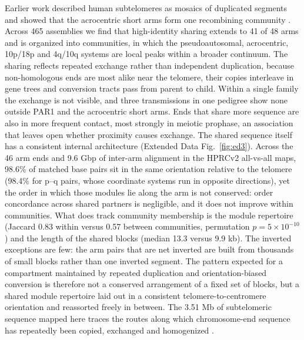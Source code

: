 \documentclass[pdflatex,mathphys]{jnl}
\begin{document}
Earlier work described human subtelomeres as mosaics of duplicated segments \cite{Linardopoulou2005} and showed that the acrocentric short arms form one recombining community \cite{Guarracino2023}. Across 465 assemblies we find that high-identity sharing extends to 41 of 48 arms and is organized into communities, in which the pseudoautosomal, acrocentric, 10p/18p and 4q/10q systems are local peaks within a broader continuum. The sharing reflects repeated exchange rather than independent duplication, because non-homologous ends are most alike near the telomere, their copies interleave in gene trees and conversion tracts pass from parent to child. Within a single family the exchange is not visible, and three transmissions in one pedigree show none outside PAR1 and the acrocentric short arms. Ends that share more sequence are also in more frequent contact, most strongly in meiotic prophase, an association that leaves open whether proximity causes exchange.
The shared sequence itself has a consistent internal architecture
(Extended Data Fig.~\ref{fig:ed3}). Across the 46 arm ends and
9.6 Gbp of inter-arm alignment in the HPRCv2 all-vs-all maps, 98.6\% of matched base pairs
sit in the same orientation relative to the telomere (98.4\% for p--q pairs, whose coordinate
systems run in opposite directions), yet the order in which those modules lie along the arm is
not conserved: order concordance across shared partners is negligible, and it does not improve
within communities. What does track community membership is the module repertoire
(Jaccard 0.83 within versus 0.57 between communities, permutation $p = 5\times10^{-10}$) and
the length of the shared blocks (median 13.3 versus 9.9 kb). The inverted exceptions are few: the
arm pairs that are net inverted are built from thousands of small blocks rather than one
inverted segment. The pattern expected for a compartment maintained by repeated duplication and
orientation-biased conversion is therefore not a conserved arrangement of a fixed set of
blocks, but a shared module repertoire laid out in a consistent telomere-to-centromere
orientation and reassorted freely in between. The 3.51 Mb of subtelomeric sequence mapped here
traces the routes along which chromosome-end sequence has repeatedly been copied,
exchanged and homogenized \cite{Dover1982,concerted_evolution_nahr_Hastings2009}.
\end{document}
